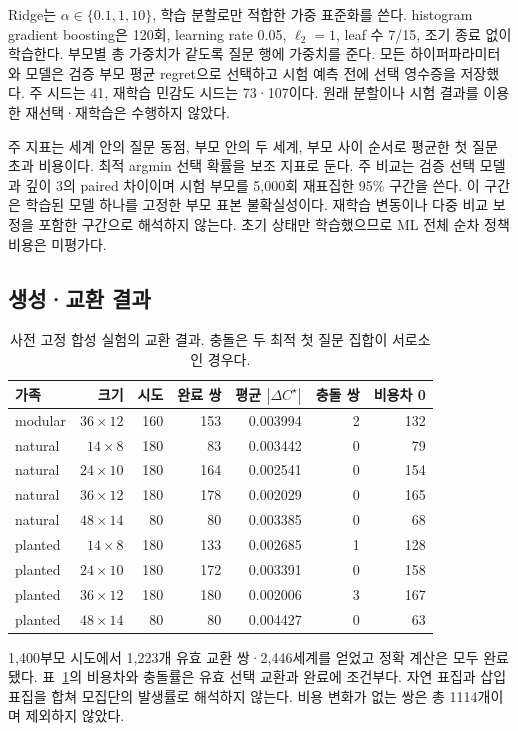 \documentclass[11pt,a4paper]{article}
\theoremstyle{definition}
\theoremstyle{remark}\newtheorem{remark}[theorem]{주석}
\newcommand{\Opt}{C^{\star}}
\begin{document}
Ridge는 $\alpha\in\{0.1,1,10\}$, 학습 분할로만 적합한 가중 표준화를 쓴다. histogram gradient boosting은 120회, learning rate 0.05, $\ell_2=1$, leaf 수 7/15, 조기 종료 없이 학습한다. 부모별 총 가중치가 같도록 질문 행에 가중치를 준다. 모든 하이퍼파라미터와 모델은 검증 부모 평균 regret으로 선택하고 시험 예측 전에 선택 영수증을 저장했다. 주 시드는 41, 재학습 민감도 시드는 73·107이다. 원래 분할이나 시험 결과를 이용한 재선택·재학습은 수행하지 않았다.

주 지표는 세계 안의 질문 동점, 부모 안의 두 세계, 부모 사이 순서로 평균한 첫 질문 초과 비용이다. 최적 argmin 선택 확률을 보조 지표로 둔다. 주 비교는 검증 선택 모델과 깊이 3의 paired 차이이며 시험 부모를 5,000회 재표집한 95\% 구간을 쓴다. 이 구간은 학습된 모델 하나를 고정한 부모 표본 불확실성이다. 재학습 변동이나 다중 비교 보정을 포함한 구간으로 해석하지 않는다. 초기 상태만 학습했으므로 ML 전체 순차 정책 비용은 미평가다.

\subsection{생성·교환 결과}
\begin{table}[htbp]
\centering\small
\caption{사전 고정 합성 실험의 교환 결과. 충돌은 두 최적 첫 질문 집합이 서로소인 경우다.}\label{tab:occurrence}
\begin{tabular}{lrrrrrr}\toprule
가족 & 크기 & 시도 & 완료 쌍 & 평균 $|\Delta\Opt|$ & 충돌 쌍 & 비용차 0\\\midrule
modular & $36\times12$ & 160 & 153 & 0.003994 & 2 & 132\\
natural & $14\times8$ & 180 & 83 & 0.003442 & 0 & 79\\
natural & $24\times10$ & 180 & 164 & 0.002541 & 0 & 154\\
natural & $36\times12$ & 180 & 178 & 0.002029 & 0 & 165\\
natural & $48\times14$ & 80 & 80 & 0.003385 & 0 & 68\\
planted & $14\times8$ & 180 & 133 & 0.002685 & 1 & 128\\
planted & $24\times10$ & 180 & 172 & 0.003391 & 0 & 158\\
planted & $36\times12$ & 180 & 180 & 0.002006 & 3 & 167\\
planted & $48\times14$ & 80 & 80 & 0.004427 & 0 & 63\\
\bottomrule\end{tabular}

\end{table}

1,400부모 시도에서 1,223개 유효 교환 쌍·2,446세계를 얻었고 정확 계산은 모두 완료됐다. 표~\ref{tab:occurrence}의 비용차와 충돌률은 유효 선택 교환과 완료에 조건부다. 자연 표집과 삽입 표집을 합쳐 모집단의 발생률로 해석하지 않는다. 비용 변화가 없는 쌍은 총 1114개이며 제외하지 않았다.
\end{document}
